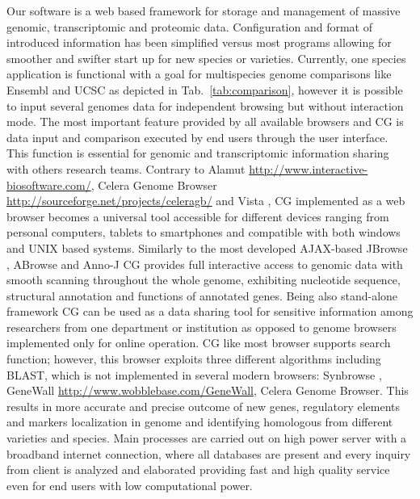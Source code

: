 \documentclass[a4paper]{spie}
\newcommand{\appShortcut}{CG}
\begin{document}
Our software is a web based framework for storage and management of massive genomic, transcriptomic and proteomic data.
Configuration and format of introduced information has been simplified versus most programs allowing for smoother and swifter start up for new species or varieties.
Currently, one species application is functional with a goal for multispecies genome comparisons like  Ensembl and UCSC as depicted in Tab.~\ref{tab:comparison},
however it is possible to input several genomes data for independent browsing  but without interaction mode.
The most important feature provided by all available browsers and \appShortcut{} is data input and comparison executed by end users through the user interface.
This function is essential for genomic and transcriptomic information sharing with others research teams.
Contrary to Alamut \url{http://www.interactive-biosoftware.com/}, Celera Genome Browser \url{http://sourceforge.net/projects/celeragb/}
and Vista \cite{visel2007vista}, \appShortcut{} implemented as a web browser becomes a universal tool accessible for different devices ranging from personal computers,
tablets to smartphones and compatible with both windows and UNIX based systems.
Similarly to the most developed AJAX-based JBrowse \cite{skinner2009jbrowse}, ABrowse \cite{kong2012abrowse} and Anno-J \cite{lister2008highly}
\appShortcut{} provides full interactive access to genomic data with smooth scanning throughout the whole genome,
exhibiting nucleotide sequence, structural annotation and functions of annotated genes.
Being also stand-alone framework \appShortcut{} can be used as a data sharing tool for sensitive information
among researchers from one department or institution as opposed to genome browsers implemented only for online operation.
\appShortcut{} like most browser supports search function; however, this browser exploits three different algorithms including BLAST,
which is not implemented in several modern browsers: Synbrowse \cite{pan2005synbrowse}, GeneWall \url{http://www.wobblebase.com/GeneWall},
Celera Genome Browser.
This results in more accurate and precise outcome of new genes, regulatory elements and markers localization in genome and identifying homologous
from different varieties and species.
Main processes are carried out on  high power server with a broadband internet connection,
where all databases are present and every inquiry from client is analyzed and elaborated providing fast and high quality service
even for end users with low computational power.
\end{document}
